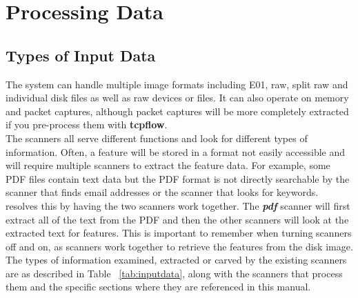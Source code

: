 \documentclass[11pt]{article} %
\begin{document}
\section{Processing Data}
\subsection{Types of Input Data}

The \bulk system can handle multiple image formats including E01, raw, split raw and individual disk files as well as raw devices or files.  It can also operate on memory and packet captures, although packet captures will be more completely extracted if you pre-process them with \textbf{tcpflow}.\\

The scanners all serve different functions and look for different types of information. Often, a feature will be stored in a format not easily accessible and will require multiple scanners to extract the feature data. For example, some PDF files contain text data but the PDF format is not directly searchable by the scanner that finds email addresses or the scanner that looks for keywords. \bulk resolves this by having the two scanners work together. The \textbf{\textit{pdf}} scanner will first extract all of the text from the PDF and then the other scanners will look at the extracted text for features. This is important to remember when turning scanners off and on, as scanners work together to retrieve the features from the disk image. The types of information examined, extracted or carved by the existing \bulk scanners are as described in Table ~\ref{tab:inputdata}, along with the scanners that process them and the specific sections where they are referenced in this manual.
\end{document}
